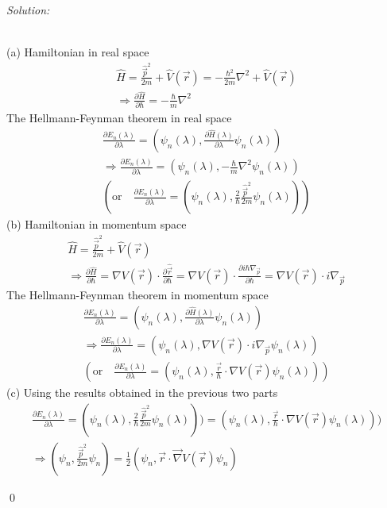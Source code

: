 \documentclass[12pt,a4paper]{article}
\newenvironment{sol}
    {\emph{Solution:}
    }
    {
    \qed
    }
\begin{document}
\begin{sol}
\\(a) Hamiltonian in real space
\begin{gather}
\hat{H}=\frac{\hat{\vec{p}}^2}{2m}+\hat{V}(\vec{r})=-\frac{\hbar^2}{2m}\nabla^2+\hat{V}(\vec{r})\\
\Longrightarrow\frac{\partial\hat{H}}{\partial\hbar}=-\frac{\hbar}{m}\nabla^2
\end{gather}
The Hellmann-Feynman theorem in real space
\begin{gather}
\frac{\partial E_n(\lambda)}{\partial\lambda}=(\psi_n(\lambda),\frac{\partial\hat{H}(\lambda)}{\partial\lambda}\psi_n(\lambda))\\
\Longrightarrow\frac{\partial E_n(\lambda)}{\partial\lambda}=(\psi_n(\lambda),-\frac{\hbar}{m}\nabla^2\psi_n(\lambda))\\
(\text{or}\quad\frac{\partial E_n(\lambda)}{\partial\lambda}=(\psi_n(\lambda),\frac{2}{\hbar}\frac{\hat{\vec{p}}^2}{2m}\psi_n(\lambda)))
\end{gather}
(b) Hamiltonian in momentum space
\begin{gather}
\hat{H}=\frac{\hat{\vec{p}}^2}{2m}+\hat{V}(\vec{r})\\
\Longrightarrow\frac{\partial\hat{H}}{\partial\hbar}=\nabla V(\vec{r})\cdot\frac{\partial\hat{\vec{r}}}{\partial\hbar}=\nabla V(\vec{r})\cdot\frac{\partial i\hbar\nabla_{\vec{p}}}{\partial\hbar}=\nabla V(\vec{r})\cdot i\nabla_{\vec{p}}
\end{gather}
The Hellmann-Feynman theorem in momentum space
\begin{gather}
\frac{\partial E_n(\lambda)}{\partial\lambda}=(\psi_n(\lambda),\frac{\partial\hat{H}(\lambda)}{\partial\lambda}\psi_n(\lambda))\\
\Longrightarrow\frac{\partial E_n(\lambda)}{\partial\lambda}=(\psi_n(\lambda),\nabla V(\vec{r})\cdot i\nabla_{\vec{p}}\psi_n(\lambda))\\
(\text{or}\quad\frac{\partial E_n(\lambda)}{\partial\lambda}=(\psi_n(\lambda),\frac{\vec{r}}{\hbar}\cdot\nabla V(\vec{r})\psi_n(\lambda)))
\end{gather}
(c) Using the results obtained in the previous two parts
\begin{gather}
\frac{\partial E_n(\lambda)}{\partial\lambda}=(\psi_n(\lambda),\frac{2}{\hbar}\frac{\hat{\vec{p}}^2}{2m}\psi_n(\lambda)))=(\psi_n(\lambda),\frac{\vec{r}}{\hbar}\cdot\nabla V(\vec{r})\psi_n(\lambda)))\\
\Longrightarrow(\psi_n,\frac{\hat{\vec{p}}^2}{2m}\psi_n)=\frac{1}{2}(\psi_n,\vec{r}\cdot\vec{\nabla}V(\vec{r})\psi_n)
\end{gather}
\end{sol}
\end{document}
